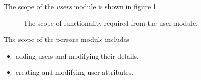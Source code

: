 The scope of the \emph{users} module is shown in figure \ref{fig:users_scope}

\begin{figure}[htb]
\begin{center}
\end{center}
\caption{The scope of functionality required from the user module. \label{fig:users_scope}}
\end{figure}

The scope of the persons module includes
\begin{itemize}
 \item adding users and modifying their details,
 \item creating and modifying user attributes.
\end{itemize}

